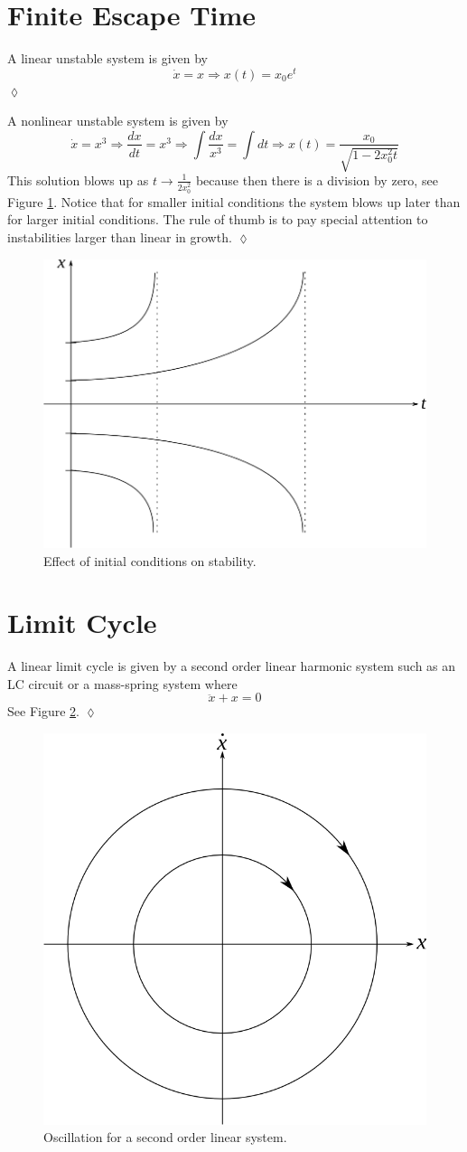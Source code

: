 \section{Finite Escape Time}
\label{sec:01fet}
\begin{example}
A linear unstable system is given by
$$\dot{x} = x \Rightarrow x(t) = x_0e^t$$
$\lozenge$
\end{example}

\begin{example}
A nonlinear unstable system is given by
$$\dot{x} = x^3 \Rightarrow \frac{dx}{dt}=x^3 \Rightarrow \int\frac{dx}{x^3} = \int dt \Rightarrow x(t) = \frac{x_0}{\sqrt{1-2x_0^2t}}$$
This solution blows up as $t\to\frac{1}{2x_0^2}$ because then there is a division by zero, see Figure \ref{fig:01blowup}. Notice that for smaller initial conditions the system blows up later than for larger initial conditions. The rule of thumb is to pay special attention to instabilities larger than linear in growth.
$\lozenge$
\end{example}

\begin{figure}[ht!]
	\centering
	\includegraphics[width=.4\textwidth]{images/01blowup}
	\caption{Effect of initial conditions on stability.}
	\label{fig:01blowup}
\end{figure}

\section{Limit Cycle}
\begin{example}
A linear limit cycle is given by a second order linear harmonic system such as an LC circuit or a mass-spring system where
$$\ddot{x} + x = 0$$
See Figure \ref{fig:01secondorder}.
$\lozenge$
\end{example}

\begin{figure}[ht!]
	\centering
	\includegraphics[width=.4\textwidth]{images/01secondorder}
	\caption{Oscillation for a second order linear system.}
	\label{fig:01secondorder}
\end{figure}

